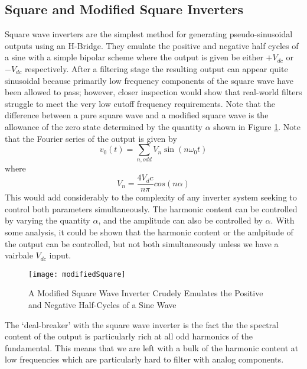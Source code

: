 \subsection{Square and Modified Square Inverters}
\label{squareApproach}
Square wave inverters are the simplest method for generating pseudo-sinusoidal outputs using an H-Bridge. They emulate the positive and negative half cycles of a sine with a simple bipolar scheme where the output is given be either $+V_{dc}$ or $-V_{dc}$ respectively. After a filtering stage the resulting output can appear quite sinusoidal because primarily low frequency components of the square wave have been allowed to pass; however, closer inspection would show that real-world filters struggle to meet the very low cutoff frequency requirements. Note that the difference between a pure square wave and a modified square wave is the allowance of the zero state determined by the quantity $\alpha$ shown in Figure \ref{modifiedSquare}. Note that the Fourier series of the output is given by 
\begin{equation}
v_0(t)=\sum\limits_{n,odd}V_n\sin{(n\omega_0t)}
\end{equation}
where 
\begin{equation}
V_n=\frac{4V_dc}{n\pi}cos{(n\alpha)}
\end{equation}
This would add considerably to the complexity of any inverter system seeking to control both parameters simultaneously. The harmonic content can be controlled by varying the quantity $\alpha$, and the amplitude can also be controlled by $\alpha$. With some analysis, it could be shown that the harmonic content or the amlpitude of the output can be controlled, but not both simultaneously unless we have a vairbale $V_{dc}$ input. 

\begin{figure}[h]
\centering
\texttt{[image: modifiedSquare]}
\caption{A Modified Square Wave Inverter Crudely Emulates the Positive and Negative Half-Cycles of a Sine Wave}
\label{modifiedSquare}
\end{figure}

The `deal-breaker' with the square wave inverter is the fact the the spectral content of the output is particularly rich at all odd harmonics of the fundamental. This means that we are left with a bulk of the harmonic content at low frequencies which are particularly hard to filter with analog components. 

